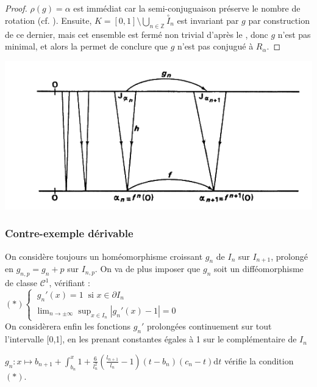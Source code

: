 \documentclass[11pt,a4paper]{article}
\begin{document}
\begin{proof}
$\rho(g)=\alpha$ est immédiat car la semi-conjuguaison préserve le nombre de rotation (cf. \cite{dgv}).
Ensuite, $K = [0,1] \setminus \bigcup_{n \in \mathbb{Z}} \overset{\circ}I_{n}$ est invariant par $g$ par construction de ce dernier, mais cet ensemble est fermé non trivial d'après le  , donc $g$ n'est pas minimal, et alors la  permet de conclure que $g$ n'est pas conjugué à $R_\alpha$. 
\end{proof}

\begin{centering}
\includegraphics[scale=0.452]{diagram.png}
\end{centering}

\subsubsection{Contre-exemple dérivable}

On considère toujours un homéomorphisme croissant $g_n$ de $I_n$ sur $I_{n+1}$, prolongé en $g_{n,p} = g_n +p$ sur $I_{n,p}$. On va de plus imposer que $g_n$ soit un difféomorphisme de classe $\mathcal{C}^1$, vérifiant : \\

$(*) \begin{cases}\ g_n'(x)=1 \ \text{ si } x \in \partial I_n \\ \displaystyle \lim_{n \to \pm \infty}\sup_{x\in I_n}|g_n'(x)-1|=0 \end{cases}$ \\

On considèrera enfin les fonctions $g_n'$ prolongées continuement sur tout l'intervalle [0,1], en les prenant constantes égales à 1 sur le complémentaire de $I_n$

\begin{lemma}
$\displaystyle g_n : x \mapsto b_{n+1} + \int_{b_n}^x 1 + \frac{6}{l_n^2}(\frac{l_{n+1}}{l_n} -1)(t-b_n)(c_n-t)\mathrm{d}t$ vérifie la condition $(*)$.
\end{lemma}
\end{document}
